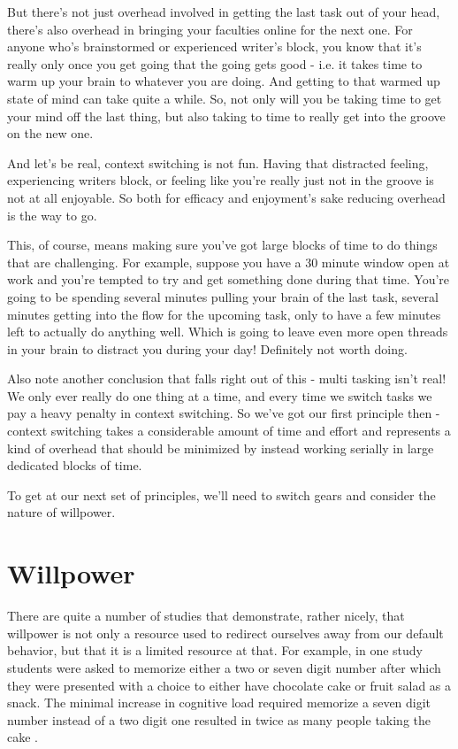 \documentclass[11pt]{book}
\begin{document}
But there's not just overhead involved in getting the last task out of your head, there's also overhead in bringing your faculties online for the next one. For anyone who's brainstormed or experienced writer's block, you know that it's really only once you get going that the going gets good - i.e. it takes time to warm up your brain to whatever you are doing. And getting to that warmed up state of mind can take quite a while. So, not only will you be taking time to get your mind off the last thing, but also taking to time to really get into the groove on the new one. 
\newline

And let's be real, context switching is not fun. Having that distracted feeling, experiencing writers block, or feeling like you're really just not in the groove is not at all enjoyable. So both for efficacy and enjoyment's sake reducing overhead is the way to go. 
\newline

This, of course, means making sure you've got large blocks of time to do things that are challenging. For example, suppose you have a 30 minute window open at work and you're tempted to try and get something done during that time. You're going to be spending several minutes pulling your brain of the last task, several minutes getting into the flow for the upcoming task, only to have a few minutes left to actually do anything well. Which is going to leave even more open threads in your brain to distract you during your day! Definitely not worth doing. 
\newline

Also note another conclusion that falls right out of this - multi tasking isn't real! We only ever really do one thing at a time, and every time we switch tasks we pay a heavy penalty in context switching. So we've got our first principle then - context switching takes a considerable amount of time and effort and represents a kind of overhead that should be minimized by instead working serially in large dedicated blocks of time.
\newline

To get at our next set of principles, we'll need to switch gears and consider the nature of willpower.

\section{Willpower}
There are quite a number of studies that demonstrate, rather nicely, that willpower is not only a resource used to redirect ourselves away from our default behavior, but that it is a limited resource at that. For example, in one study students were asked to memorize either a two or seven digit number after which they were presented with a choice to either have chocolate cake or fruit salad as a snack. The minimal increase in cognitive load required memorize a seven digit number instead of a two digit one resulted in twice as many people taking the cake \cite{keller}. 
\newline
\end{document}
